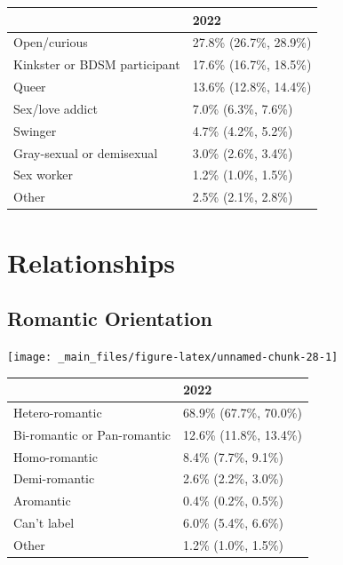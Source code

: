 \documentclass[
]{book}
\begin{document}
\begin{table}
\centering
\begin{tabular}[t]{>{}l|>{}l}
\hline
  & 2022\\
\hline
Open/curious & 27.8\% (26.7\%, 28.9\%)\\
\hline
Kinkster or BDSM participant & 17.6\% (16.7\%, 18.5\%)\\
\hline
Queer & 13.6\% (12.8\%, 14.4\%)\\
\hline
Sex/love addict & 7.0\% (6.3\%, 7.6\%)\\
\hline
Swinger & 4.7\% (4.2\%, 5.2\%)\\
\hline
Gray-sexual or demisexual & 3.0\% (2.6\%, 3.4\%)\\
\hline
Sex worker & 1.2\% (1.0\%, 1.5\%)\\
\hline
Other & 2.5\% (2.1\%, 2.8\%)\\
\hline
\end{tabular}
\end{table}

\hypertarget{relationships}{%
\section{Relationships}\label{relationships}}

\hypertarget{romantic-orientation}{%
\subsection{Romantic Orientation}\label{romantic-orientation}}

\texttt{[image: \_main\_files/figure-latex/unnamed-chunk-28-1]}

\begin{table}
\centering
\begin{tabular}[t]{>{}l|>{}l}
\hline
  & 2022\\
\hline
Hetero-romantic & 68.9\% (67.7\%, 70.0\%)\\
\hline
Bi-romantic or Pan-romantic & 12.6\% (11.8\%, 13.4\%)\\
\hline
Homo-romantic & 8.4\% (7.7\%, 9.1\%)\\
\hline
Demi-romantic & 2.6\% (2.2\%, 3.0\%)\\
\hline
Aromantic & 0.4\% (0.2\%, 0.5\%)\\
\hline
Can't label & 6.0\% (5.4\%, 6.6\%)\\
\hline
Other & 1.2\% (1.0\%, 1.5\%)\\
\hline
\end{tabular}
\end{table}
\end{document}
